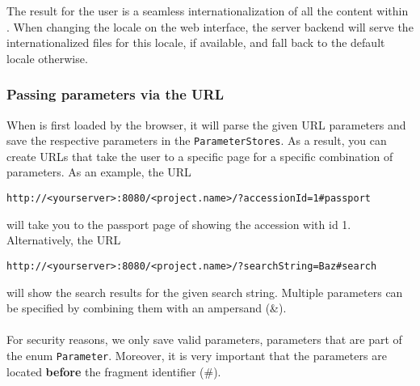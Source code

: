 The result for the user is a seamless internationalization of all the content within {\germinate}. When changing the locale on the web interface, the server backend will serve the internationalized files for this locale, if available, and fall back to the default locale otherwise. 

\subsubsection{Passing parameters via the URL}
When {\germinate} is first loaded by the browser, it will parse the given URL parameters and save the respective parameters in the \texttt{ParameterStores}. As a result, you can create URLs that take the user to a specific page for a specific combination of parameters. As an example, the URL
\begin{center}
\texttt{http://<your\textunderscore server>:8080/<project.name>/?accessionId=1\#passport}
\end{center}
will take you to the passport page of {\germinate} showing the accession with id 1. Alternatively, the URL
\begin{center}
\texttt{http://<your\textunderscore server>:8080/<project.name>/?searchString=Baz\#search}
\end{center}
will show the search results for the given search string. Multiple parameters can be specified by combining them with an ampersand (\&).\\
\\
For security reasons, we only save valid parameters, \ie parameters that are part of the enum \texttt{Parameter}. Moreover, it is very important that the parameters are located \textbf{before} the fragment identifier (\#).


